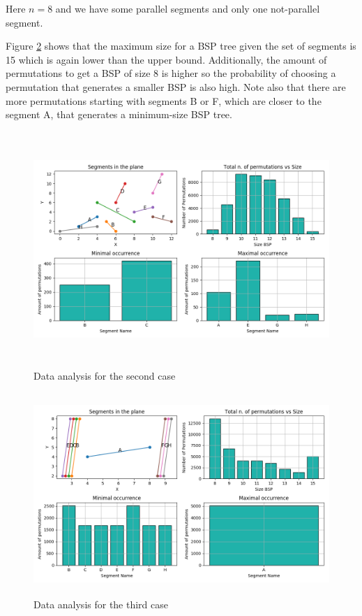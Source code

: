 \documentclass{article}
\begin{document}
Here $n=8$ and we have some parallel segments and only one not-parallel segment.

Figure \ref{fig:firstcasefig6} shows that the maximum size for a BSP tree given the set of segments is 15 which is again lower than the upper bound. Additionally, the amount of permutations to get a BSP of size 8 is higher so the probability of choosing a permutation that generates a smaller BSP is also high. Note also that there are more permutations starting with segments B or F, which are closer to the segment A, that generates a minimum-size BSP tree. 
 
\begin{figure}[H]
	\centering
	\includegraphics[height=3.5in]{Figure5.png}
	\caption {Data analysis for the second case}
	\label{fig:firstcasefig5}
\end{figure}

\begin{figure}[H]
	\centering
	\includegraphics[height=3in]{Figure6.png}
	\caption {Data analysis for the third case}
	\label{fig:firstcasefig6}
\end{figure}
\end{document}
